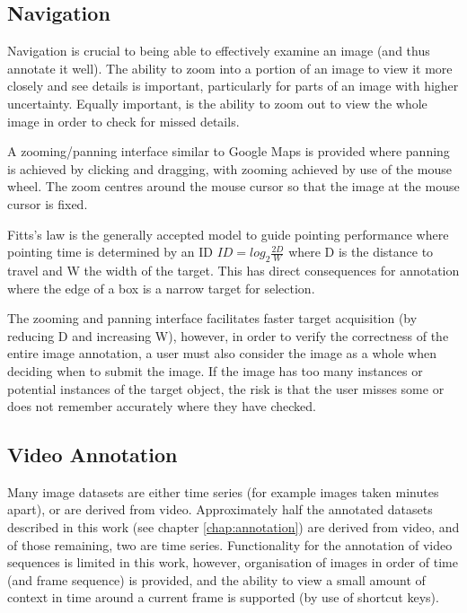 \subsection {Navigation}

Navigation is crucial to being able to effectively examine an image (and thus annotate it well). The ability to zoom into a portion of an image to view it more closely and see details is important,  particularly  for parts of an image with higher uncertainty. Equally important, is the ability to zoom out to view the whole image in order to check for missed details. 

A zooming/panning interface similar to Google Maps is provided where panning is achieved by clicking and dragging, with zooming achieved by use of the mouse wheel. The zoom centres around the mouse cursor so that the image at the mouse cursor is fixed.

Fitts's law is the generally accepted model to guide pointing performance where pointing time is determined by an \gls{ID} $ ID = log_2 \frac{2D}{W} $ where D is the distance to travel and W the width of the target. This has direct consequences for annotation where the edge of a box is a narrow target for selection. 

The zooming and panning interface facilitates faster target acquisition (by reducing D and increasing W), however, in order to verify the correctness of the entire image annotation, a user must also consider the image as a whole when deciding when to submit the image. If the image has too many instances or potential instances of the target object, the risk is that the user misses some or does not remember accurately where they have checked. 


\subsection {Video Annotation}

Many image datasets are either time series (for example images taken minutes apart), or are derived from video.  Approximately half the annotated datasets described in this work (see chapter \ref{chap:annotation})  are derived from video, and of those remaining, two are time series. Functionality for the annotation of video sequences is limited in this work, however, organisation of images in order of time (and frame sequence) is provided, and the ability to view a small amount of context in time around a current frame is supported (by use of shortcut keys).

